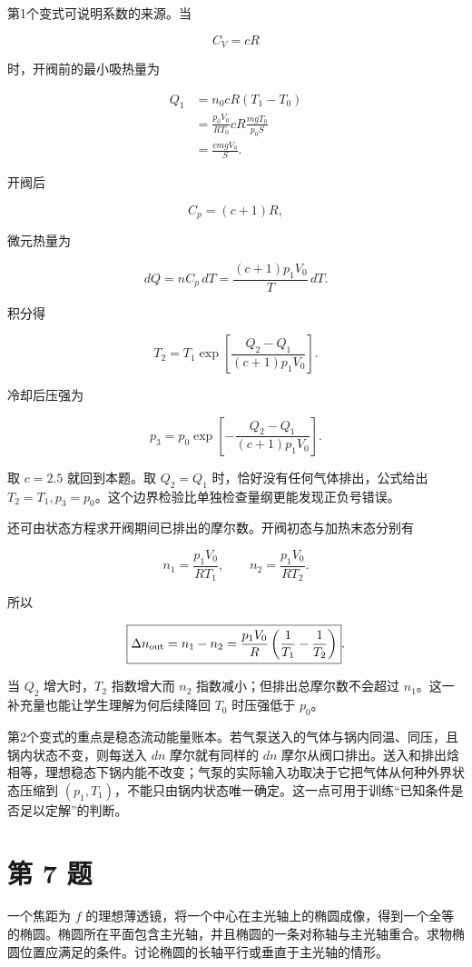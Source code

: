 \documentclass[12pt,a4paper,UTF8]{ctexart}
\begin{document}
第1个变式可说明系数的来源。当

\[C_V=cR\]

时，开阀前的最小吸热量为

\[\begin{aligned}
Q_1
&=n_0cR(T_1-T_0)\\
&=\frac{p_0V_0}{RT_0}cR
\frac{mgT_0}{p_0S}\\
&=\boxed{\frac{cmgV_0}{S}}.
\end{aligned}\]

开阀后

\[C_p=(c+1)R,\]

微元热量为

\[dQ=nC_p\,dT
=\frac{(c+1)p_1V_0}{T}\,dT.\]

积分得

\[\boxed{
T_2=T_1\exp\left[
\frac{Q_2-Q_1}{(c+1)p_1V_0}
\right]
}.\]

冷却后压强为

\[\boxed{
p_3=p_0\exp\left[
-\frac{Q_2-Q_1}{(c+1)p_1V_0}
\right]
}.\]

取 \(c=2.5\) 就回到本题。取 \(Q_2=Q_1\)
时，恰好没有任何气体排出，公式给出
\(T_2=T_1,p_3=p_0\)。这个边界检验比单独检查量纲更能发现正负号错误。

还可由状态方程求开阀期间已排出的摩尔数。开阀初态与加热末态分别有

\[n_1=\frac{p_1V_0}{RT_1},\qquad
n_2=\frac{p_1V_0}{RT_2}.\]

所以

\[\boxed{
\Delta n_{\rm out}=n_1-n_2
=\frac{p_1V_0}{R}
\left(\frac1{T_1}-\frac1{T_2}\right)
}.\]

当 \(Q_2\) 增大时，\(T_2\) 指数增大而 \(n_2\)
指数减小；但排出总摩尔数不会超过
\(n_1\)。这一补充量也能让学生理解为何后续降回 \(T_0\) 时压强低于
\(p_0\)。

第2个变式的重点是稳态流动能量账本。若气泵送入的气体与锅内同温、同压，且锅内状态不变，则每送入
\(dn\) 摩尔就有同样的 \(dn\)
摩尔从阀口排出。送入和排出焓相等，理想稳态下锅内能不改变；气泵的实际输入功取决于它把气体从何种外界状态压缩到
\((p_1,T_1)\)，不能只由锅内状态唯一确定。这一点可用于训练``已知条件是否足以定解''的判断。

\newpage

\section{第 7 题}\label{ux7b2c-7-ux9898}

一个焦距为 \(f\)
的理想薄透镜，将一个中心在主光轴上的椭圆成像，得到一个全等的椭圆。椭圆所在平面包含主光轴，并且椭圆的一条对称轴与主光轴重合。求物椭圆位置应满足的条件。讨论椭圆的长轴平行或垂直于主光轴的情形。
\end{document}
